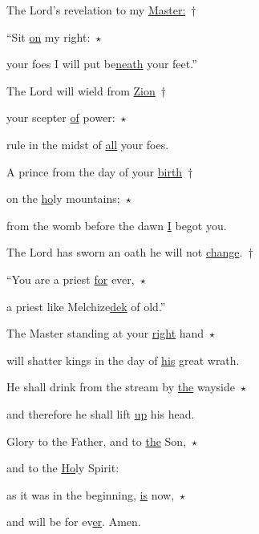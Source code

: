 
\noindent The Lord’s revelation to my \uline{Master:}~†~\nopagebreak

“Sit \uline{on} my right:~$\star$~\nopagebreak

your foes I will put be\uline{neath} your feet.”

\noindent The Lord will wield from \uline{Zion}~†~\nopagebreak

your scepter \uline{of} power:~$\star$~\nopagebreak

rule in the midst of \uline{all} your foes.

\noindent A prince from the day of your \uline{birth}~†~\nopagebreak

on the \uline{ho}ly mountains;~$\star$~\nopagebreak

from the womb before the dawn \uline{I} begot you.

\noindent The Lord has sworn an oath he will not \uline{change}.~†~\nopagebreak

“You are a priest \uline{for} ever,~$\star$~\nopagebreak

a priest like Melchize\uline{dek} of old.”

\noindent The Master standing at your \uline{right} hand~$\star$~\nopagebreak

will shatter kings in the day of \uline{his} great wrath.

\noindent He shall drink from the stream by \uline{the} wayside~$\star$~\nopagebreak

and therefore he shall lift \uline{up} his head.

\noindent Glory to the Father, and to \uline{the} Son,~$\star$~\nopagebreak

and to the \uline{Ho}ly Spirit:

\noindent as it was in the beginning, \uline{is} now,~$\star$~\nopagebreak

and will be for ev\uline{er}. Amen.
